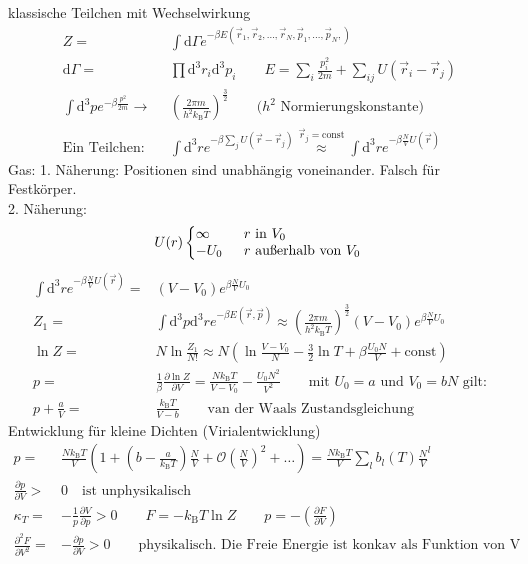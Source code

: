 \documentclass[a4paper,12pt]{scrartcl}
\def\pf#1#2{\frac{\partial #1}{\partial #2}}		%
\def\pfq#1#2{\frac{\partial^2 #1}{\partial #2^2}}	%
\def\rpf#1#2{\ka{\frac{\partial #1}{\partial #2}}}	%
\def\ka#1{\left(#1\right)}				%
\def\const{\mathrm{const}}				%
\def\d{\mathrm{d}}					%
\def\ddd{\mathrm{d}^3}					%
\def\kB{k_\mathrm{B}}					%
\begin{document}
klassische Teilchen mit Wechselwirkung
\begin{align*}
	Z=&\int\d\Gamma e^{-\beta E(\vec r_1,\vec r_2,\ldots,\vec r_N,\vec p_1,\ldots,\vec p_N,)}\\
	\d\Gamma=&\prod\ddd r_i\ddd p_i\qquad E=\sum_i\frac{p_i^2}{2m}+\sum_{ij}U(\vec r_i-\vec r_j)\\
	\int\ddd pe^{-\beta\frac{p^2}{2m}}\rightarrow&\ka{\frac{2\pi m}{h^2\kB T}}^{\frac32}\qquad\text{($h^2$ 
Normierungskonstante)}\\
	\text{Ein Teilchen:}\quad&\int\ddd re^{-\beta\sum_jU(\vec r-\vec r_j)}\stackrel{\vec 
r_j=\const}{\approx}\int\ddd re^{-\beta\frac NVU(\vec r)}
\end{align*}
Gas: 1. Näherung: Positionen sind unabhängig voneinander. Falsch für Festkörper.\\
 2. Näherung:	\[U(r)\left\{ {
		\begin{minipage}[c]{5.2cm}
			\begin{tabbing}
			infinity \= weitere Zeile nicht so wichtig\kill
			$\infty\quad$\>$\text{$r$ in $V_0$}$\\
			$-U_0\quad$\>$\text{$r$ außerhalb von $V_0$}$
			\end{tabbing}
		\end{minipage}
	}\right.\\ \]
\begin{align*}
	\int\ddd re^{-\beta\frac NVU(\vec r)}=&(V-V_0)e^{\beta\frac NVU_0}\\
	Z_1=&\int\ddd p\ddd re^{-\beta E(\vec r,\vec p)}\approx\ka{\frac{2\pi m}{h^2\kB T}}^{\frac32}(V-V_0)e^{\beta\frac NVU_0}\\
	\ln Z=&N\ln\frac{Z_1}{N!}\approx N\ka{\ln\frac{V-V_0}{N}-\frac32\ln T+\beta\frac{U_0N}V+\const}\\
	p=&\frac1\beta\pf{\ln Z}V=\frac{N\kB T}{V-V_0}-\frac{U_0N^2}{V^2}\qquad\text{mit $U_0=a$ und $V_0=bN$ gilt:}\\
	p+\frac aV=&\frac{\kB T}{V-b}\qquad\text{van der Waals Zustandsgleichung}
\end{align*}
Entwicklung für kleine Dichten (Virialentwicklung)
\begin{align*}
	p=&\frac{N\kB T}{V}\ka{1+(b-\frac a{\kB T})\frac NV+\mathscr{O}\ka{\frac 
NV}^2+\ldots}=\frac{N\kB T}{V}\sum_lb_l(T){\frac NV}^l\\
	\pf pV>&0\quad\text{ist unphysikalisch}\\
	\kappa_T=&-\frac1p\pf Vp>0\qquad
	F=-\kB T\ln Z\qquad
	p=-\rpf FV\\
	\pfq FV=&-\pf pV>0\qquad\text{physikalisch. Die Freie Energie ist konkav als Funktion von V}
\end{align*}
\end{document}
